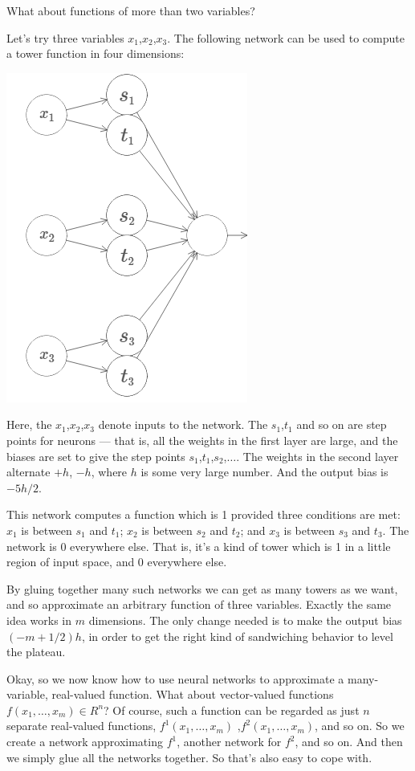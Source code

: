 What about functions of more than two variables?

Let's try three variables $x_1$,$x_2$,$x_3$. The following network can be used to compute a tower function in four dimensions:

{\centering \includegraphics[width=.5\textwidth,]{pic/wigglyfn37} \par}


Here, the $x_1$,$x_2$,$x_3$ denote inputs to the network. The $s_1$,$t_1$ and so on are step points for neurons --- that is, all the weights in the first layer are large, and the biases are set to give the step points $s_1$,$t_1$,$s_2$,$\ldots$. The weights in the second layer alternate $+h$, $-h$, where $h$ is some very large number. And the output bias is $-5h/2$.

This network computes a function which is 1 provided three conditions are met: $x_1$ is between $s_1$ and $t_1$; $x_2$ is between $s_2$ and $t_2$; and $x_3$ is between $s_3$ and $t_3$. The network is 0 everywhere else. That is, it's a kind of tower which is 1 in a little region of input space, and 0 everywhere else.


By gluing together many such networks we can get as many towers as we want, and so approximate an arbitrary function of three variables. Exactly the same idea works in $m$
dimensions. The only change needed is to make the output bias $(-m+1/2)h$, in order to get the right kind of sandwiching behavior to level the plateau.

Okay, so we now know how to use neural networks to approximate a many-variable, real-valued function. What about vector-valued functions $f(x_1,\ldots,x_m)\in R^n$? Of course, such a function can be regarded as just $n$ separate real-valued functions, $f^1(x_1,\ldots,x_m)$ ,$f^2(x_1,\ldots,x_m)$, and so on. So we create a network approximating $f^1$, another network for $f^2$, and so on. And then we simply glue all the networks together. So that's also easy to cope with.


